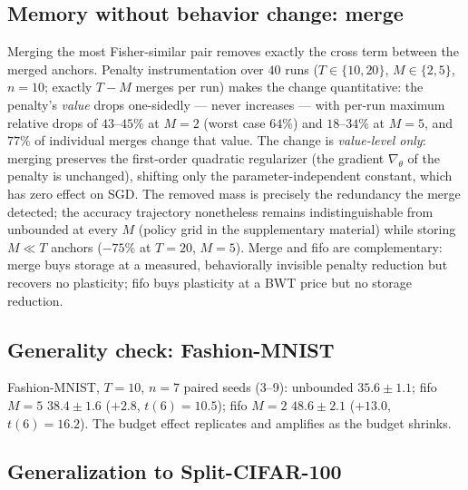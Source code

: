 \documentclass[review,12pt,number]{elsarticle}
\begin{document}
\subsection{Memory without behavior change: merge}
\label{sec:exp-merge}

Merging the most Fisher-similar pair removes exactly the cross term
between the merged anchors. Penalty instrumentation over $40$ runs
($T \in \{10,20\}$, $M \in \{2,5\}$, $n{=}10$; exactly $T{-}M$ merges
per run) makes the change quantitative: the penalty's \emph{value} drops
one-sidedly --- never increases --- with per-run maximum relative
drops of $43$--$45\%$ at $M{=}2$ (worst case $64\%$) and $18$--$34\%$
at $M{=}5$, and $77\%$ of individual merges change that value. The
change is \emph{value-level only}: merging preserves the first-order
quadratic regularizer (the gradient $\nabla_\theta$ of the penalty is
unchanged), shifting only the parameter-independent constant, which
has zero effect on SGD. The removed mass is precisely the redundancy
the merge detected; the
accuracy trajectory nonetheless remains indistinguishable from
unbounded at every $M$ (policy grid in the supplementary material) while storing
$M \ll T$ anchors ($-75\%$ at $T{=}20$, $M{=}5$).
Merge and fifo are complementary: merge buys storage at a measured,
behaviorally invisible penalty reduction but recovers no plasticity;
fifo buys plasticity at a BWT price but no storage reduction.

\subsection{Generality check: Fashion-MNIST}
\label{sec:exp-fashion}

Fashion-MNIST, $T{=}10$, $n{=}7$ paired seeds (3--9): unbounded
$35.6\pm1.1$; fifo $M{=}5$ $38.4\pm1.6$ ($+2.8$, $t(6){=}10.5$); fifo
$M{=}2$ $48.6\pm2.1$ ($+13.0$, $t(6){=}16.2$). The budget
effect replicates and amplifies as the budget shrinks.

\subsection{Generalization to Split-CIFAR-100}
\label{sec:exp-cifar}
\end{document}
